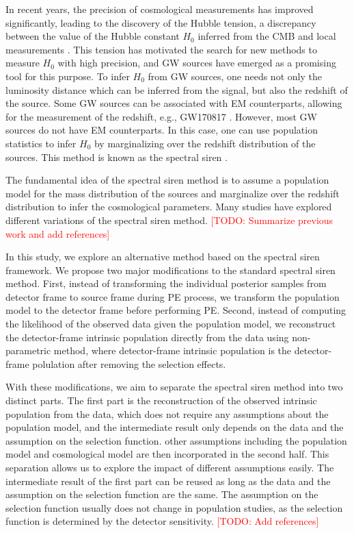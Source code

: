 \documentclass[aps,prd,twocolumn,superscriptaddress,preprintnumbers,nofootinbib,hidelinks]{revtex4-2}
\newcommand{\todo}[1]{\textcolor{red}{[TODO: #1]}}
\begin{document}
In recent years, the precision of cosmological measurements has improved significantly, leading to the discovery of the Hubble tension, a discrepancy between the value of the Hubble constant $H_0$ inferred from the \ac{CMB} \citep{Planck:2018vyg} and local measurements \citep{Riess:2021jrx}.
This tension has motivated the search for new methods to measure $H_0$ with high precision, and \ac{GW} sources have emerged as a promising tool for this purpose.
To infer $H_0$ from \ac{GW} sources, one needs not only the luminosity distance which can be inferred from the signal, but also the redshift of the source.
Some \ac{GW} sources can be associated with \ac{EM} counterparts, allowing for the measurement of the redshift, e.g., GW170817 \citep{LIGOScientific:2017adf, Guidorzi:2017ogy}.
However, most \ac{GW} sources do not have \ac{EM} counterparts.
In this case, one can use population statistics to infer $H_0$ by marginalizing over the redshift distribution of the sources.
This method is known as the spectral siren \citep{You:2020wju, Mastrogiovanni:2021wsd, LIGOScientific:2021aug, Ezquiaga:2022zkx}.

The fundamental idea of the spectral siren method is to assume a population model for the mass distribution of the sources and marginalize over the redshift distribution to infer the cosmological parameters.
Many studies have explored different variations of the spectral siren method.
\todo{Summarize previous work and add references}

In this study, we explore an alternative method based on the spectral siren framework.
We propose two major modifications to the standard spectral siren method.
First, instead of transforming the individual posterior samples from detector frame to source frame during \ac{PE} process, we transform the population model to the detector frame before performing \ac{PE}.
Second, instead of computing the likelihood of the observed data given the population model, we reconstruct the detector-frame intrinsic population directly from the data using non-parametric method, where detector-frame intrinsic population is the detector-frame polulation after removing the selection effects.

With these modifications, we aim to separate the spectral siren method into two distinct parts.
The first part is the reconstruction of the observed intrinsic population from the data, which does not require any assumptions about the population model, and the intermediate result only depends on the data and the assumption on the selection function.
other assumptions including the population model and cosmological model are then incorporated in the second half.
This separation allows us to explore the impact of different assumptions easily.
The intermediate result of the first part can be reused as long as the data and the assumption on the selection function are the same.
The assumption on the selection function usually does not change in population studies, as the selection function is determined by the detector sensitivity.
\todo{Add references}
\end{document}
